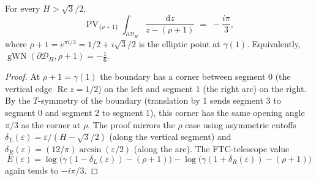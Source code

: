 \begin{theorem}
  \label{thm:gwn-at-rho-plus-one}
  \leanok
  For every $H > \sqrt{3}/2$,
  \[
    \operatorname{PV}_{\{\rho + 1\}}\!\!\int_{\partial \mathcal{D}_H}
      \frac{\mathrm{d}z}{z - (\rho + 1)}
    \;=\; -\frac{i\pi}{3},
  \]
  where $\rho + 1 = e^{\pi i/3} = 1/2 + i\sqrt{3}/2$ is the elliptic
  point at $\gamma(1)$. Equivalently,
  $\operatorname{gWN}(\partial \mathcal{D}_H, \rho + 1)
   = -\tfrac{1}{6}$.
\end{theorem}

\begin{proof}
  \leanok
  At $\rho + 1 = \gamma(1)$ the boundary has a corner between segment
  0 (the vertical edge $\operatorname{Re} z = 1/2$) on the left and
  segment 1 (the right arc) on the right. By the $T$-symmetry of
  the boundary (translation by $1$ sends segment 3 to segment 0 and
  segment 2 to segment 1), this corner has the same opening angle
  $\pi/3$ as the corner at $\rho$. The proof mirrors the $\rho$
  case using asymmetric cutoffs $\delta_L(\varepsilon)
  = \varepsilon/(H - \sqrt{3}/2)$ (along the vertical segment)
  and $\delta_R(\varepsilon) = (12/\pi)\arcsin(\varepsilon/2)$
  (along the arc). The FTC-telescope value
  \[
    E(\varepsilon) =
    \log\!\bigl(\gamma(1 - \delta_L(\varepsilon)) - (\rho+1)\bigr)
    - \log\!\bigl(\gamma(1 + \delta_R(\varepsilon)) - (\rho+1)\bigr)
  \]
  again tends to $-i\pi/3$.
\end{proof}
